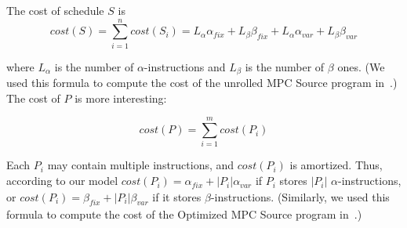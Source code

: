 

The cost of schedule $S$ is
\begin{equation}
    \mathit{cost}(S) = \sum_{i=1}^n \mathit{cost}(S_i) = L_\alpha \alpha_\mathit{fix} + L_\beta \beta_\mathit{fix} + L_\alpha \alpha_\mathit{var} + L_\beta \beta_\mathit{var}
\end{equation}

where $L_\alpha$ is the number of $\alpha$-instructions and $L_\beta$ is the number of $\beta$ ones.
(We used this formula to compute the cost of the unrolled MPC Source program in~.)
The cost of $P$ is more interesting:

\begin{equation}\label{eq_par_schedule_cost}
    \mathit{cost}(P) = \sum_{i=1}^m \mathit{cost}(P_i)
\end{equation}

Each $P_i$ may contain multiple instructions, and $\mathit{cost}(P_i)$ is amortized.
Thus, according to our model $\mathit{cost}(P_i) = \alpha_\mathit{fix} + |P_i|\alpha_\mathit{var}$ if $P_i$ stores $|P_i|$ $\alpha$-instructions, 
or $\mathit{cost}(P_i) = \beta_\mathit{fix} + |P_i|\beta_\mathit{var}$ if it stores $\beta$-instructions. 
(Similarly, we used this formula to compute the cost of the Optimized MPC Source program in~.)


